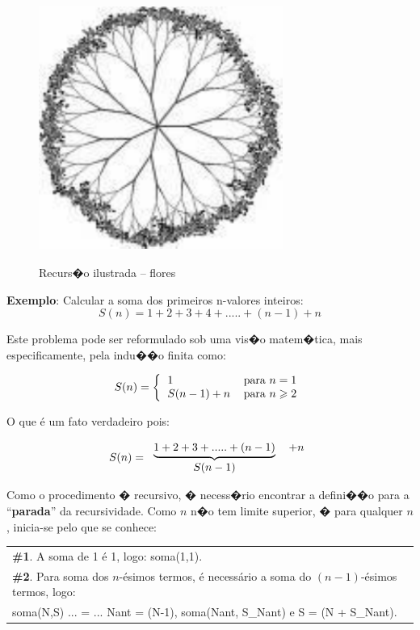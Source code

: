 \documentclass[final,a4paper]{article}
\begin{document}
\begin{figure}[!htb]
\centering
\includegraphics[height=8cm, width=8cm]{figuras/recursividade_flores.pdf}
\label{fig_recurs_4}
\caption{Recurs�o ilustrada -- flores}
\end{figure}


\newpage 

\textbf{Exemplo}: Calcular a soma dos primeiros n-valores inteiros:%
\[
S(n)=1+2+3+4+.....+(n-1)+n
\]

Este problema pode ser reformulado sob uma vis�o matem�tica, mais
especificamente, pela indu��o finita como:%


\[
S(n)=\left \{
\begin{tabular}
[c]{ll}
$1$ & para $n=1$ \\
$S(n-1) + n $ & para $n \geqslant 2$
\end{tabular}
\right.
\]


O que \'{e} um fato verdadeiro pois:

\[
S(n)=
\begin{tabular}[c]{cc}
$\underbrace{1+2+3+.....+(n-1)}$ &  $  + n$\\
$S(n-1)$ &
\end{tabular}
\]

Como o procedimento � recursivo, � necess�rio encontrar a defini��o para a ``\textbf{parada}'' da recursividade. Como $n$ n�o tem limite superior, � para qualquer $n$, inicia-se pelo que se conhece:
{\small
\begin{center}
\begin{tabular}[c]{|p{15cm}|}\hline
\textbf{\#1}. A soma de 1 \'{e} 1, logo: soma(1,1).\\
\textbf{\#2}. Para soma dos $n$-\'{e}simos termos, \'{e} necess\'{a}rio a soma
do $(n-1)$-\'{e}simos termos, logo:\\
soma(N,S) ... = ... Nant = (N-1), soma(Nant, S\_Nant) e S = (N +
S\_Nant).\\\hline
\end{tabular}
\end{center}
}
\end{document}
